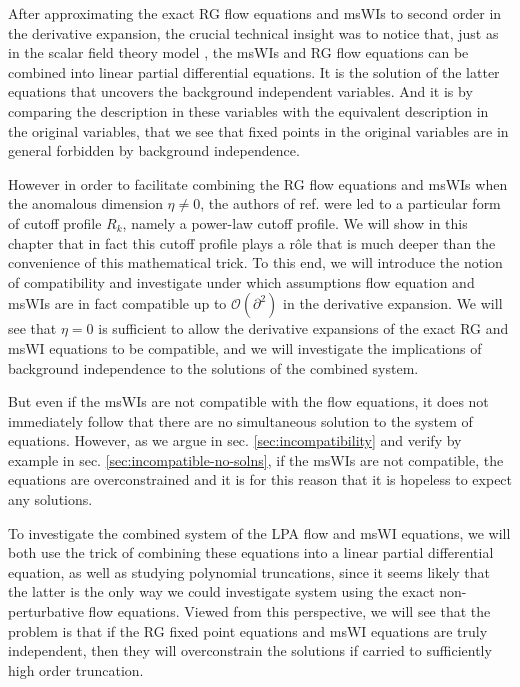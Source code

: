 \documentclass[11pt]{book} %
\numberwithin{equation}{chapter}
\begin{document}
After approximating the exact RG flow equations and msWIs to second order in the derivative expansion,
the crucial technical insight was to notice that, just as in the scalar field theory model
\cite{Bridle:2013sra}, the msWIs and RG flow equations can be combined into linear partial
differential equations.
It is the solution of the latter equations that uncovers the background independent variables.
And it is by comparing the description in these variables with the equivalent description
in the original variables, that we see that fixed points in the original variables are
in general forbidden by background independence.

However in order to facilitate combining the RG flow equations and msWIs when the anomalous
dimension $\eta\ne0$, the authors of ref. \cite{Dietz:2015owa} were led to a particular form
of cutoff profile $R_k$, namely a power-law cutoff profile.
We will show in this chapter that in fact this cutoff profile plays a r\^ole that is much
deeper than the convenience of this mathematical trick.
To this end, we will introduce the notion of compatibility and investigate under which
assumptions flow equation and msWIs are in fact compatible up to $\mathcal O(\partial^2)$
in the derivative expansion.
We will see that $\eta=0$ is sufficient to allow the derivative expansions of the exact RG and msWI equations
to be compatible, and we will investigate the implications of background independence to the solutions
of the combined system.

But even if the msWIs are not compatible with the flow equations,
it does not immediately follow that there are no simultaneous solution to the system of equations.
However, as we argue in sec. \ref{sec:incompatibility} and verify by example in
sec. \ref{sec:incompatible-no-solns},
if the msWIs are not compatible, the equations are overconstrained and it is for this reason that
it is hopeless to expect any solutions.

To investigate the combined system of the LPA flow and msWI equations,
we will both use the trick of combining these equations into a linear partial differential equation,
as well as studying polynomial truncations, since it seems likely that the latter is the only way we could
investigate system using the exact non-perturbative flow equations.
Viewed from this perspective, we will see that the problem is that if the RG fixed point equations
and msWI equations are truly independent, then they will overconstrain the solutions if
carried to sufficiently high order truncation.
\end{document}
